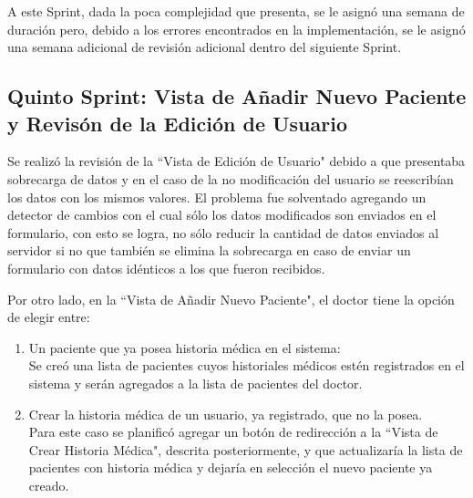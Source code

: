     A este Sprint, dada la poca complejidad que presenta, se le asignó una semana de duración pero, debido a los errores encontrados en la implementación, se le asignó una semana adicional de revisión adicional dentro del siguiente Sprint.
    
    \subsection{Quinto Sprint: Vista de Añadir Nuevo Paciente y Revisón de la Edición de Usuario}
    
    Se realizó la revisión de la ``Vista de Edición de Usuario" debido a que presentaba sobrecarga de datos y en el caso de la no modificación del usuario se reescribían los datos con los mismos valores. El problema fue solventado agregando un detector de cambios con el cual sólo los datos modificados son enviados en el formulario, con esto se logra, no sólo reducir la cantidad de datos enviados al servidor si no que también se elimina la sobrecarga en caso de enviar un formulario con datos idénticos a los que fueron recibidos.
    
    Por otro lado, en la ``Vista de Añadir Nuevo Paciente", el doctor tiene la opción de elegir entre:
    
    \begin{enumerate}
        \item\label{list} Un paciente que ya posea historia médica en el sistema:\\
        Se creó una lista de pacientes cuyos historiales médicos estén registrados en el sistema y serán agregados a la lista de pacientes del doctor.
        \item\label{new} Crear la historia médica de un usuario, ya registrado, que no la posea.\\
        Para este caso se planificó agregar un botón de redirección a la ``Vista de Crear Historia Médica", descrita posteriormente, y que actualizaría la lista de pacientes con historia médica y dejaría en selección el nuevo paciente ya creado.
    \end{enumerate}
    
